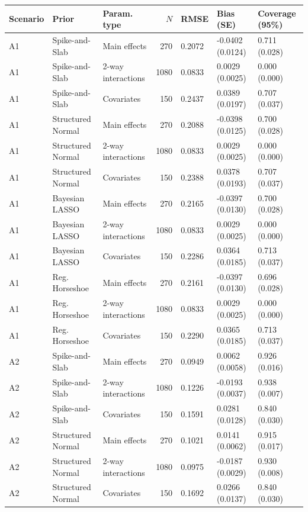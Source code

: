 \begin{tabular}{lllrlll}
  \hline
Scenario & Prior & Param. type & $N$ & RMSE & Bias (SE) & Coverage (95\%) \\ 
  \hline
A1 & Spike-and-Slab & Main effects & 270 & 0.2072 & -0.0402 (0.0124) & 0.711 (0.028) \\ 
  A1 & Spike-and-Slab & 2-way interactions & 1080 & 0.0833 & 0.0029 (0.0025) & 0.000 (0.000) \\ 
  A1 & Spike-and-Slab & Covariates & 150 & 0.2437 & 0.0389 (0.0197) & 0.707 (0.037) \\ 
  A1 & Structured Normal & Main effects & 270 & 0.2088 & -0.0398 (0.0125) & 0.700 (0.028) \\ 
  A1 & Structured Normal & 2-way interactions & 1080 & 0.0833 & 0.0029 (0.0025) & 0.000 (0.000) \\ 
  A1 & Structured Normal & Covariates & 150 & 0.2388 & 0.0378 (0.0193) & 0.707 (0.037) \\ 
  A1 & Bayesian LASSO & Main effects & 270 & 0.2165 & -0.0397 (0.0130) & 0.700 (0.028) \\ 
  A1 & Bayesian LASSO & 2-way interactions & 1080 & 0.0833 & 0.0029 (0.0025) & 0.000 (0.000) \\ 
  A1 & Bayesian LASSO & Covariates & 150 & 0.2286 & 0.0364 (0.0185) & 0.713 (0.037) \\ 
  A1 & Reg. Horseshoe & Main effects & 270 & 0.2161 & -0.0397 (0.0130) & 0.696 (0.028) \\ 
  A1 & Reg. Horseshoe & 2-way interactions & 1080 & 0.0833 & 0.0029 (0.0025) & 0.000 (0.000) \\ 
  A1 & Reg. Horseshoe & Covariates & 150 & 0.2290 & 0.0365 (0.0185) & 0.713 (0.037) \\ 
  A2 & Spike-and-Slab & Main effects & 270 & 0.0949 & 0.0062 (0.0058) & 0.926 (0.016) \\ 
  A2 & Spike-and-Slab & 2-way interactions & 1080 & 0.1226 & -0.0193 (0.0037) & 0.938 (0.007) \\ 
  A2 & Spike-and-Slab & Covariates & 150 & 0.1591 & 0.0281 (0.0128) & 0.840 (0.030) \\ 
  A2 & Structured Normal & Main effects & 270 & 0.1021 & 0.0141 (0.0062) & 0.915 (0.017) \\ 
  A2 & Structured Normal & 2-way interactions & 1080 & 0.0975 & -0.0187 (0.0029) & 0.930 (0.008) \\ 
  A2 & Structured Normal & Covariates & 150 & 0.1692 & 0.0266 (0.0137) & 0.840 (0.030) \\ 

\end{tabular}
